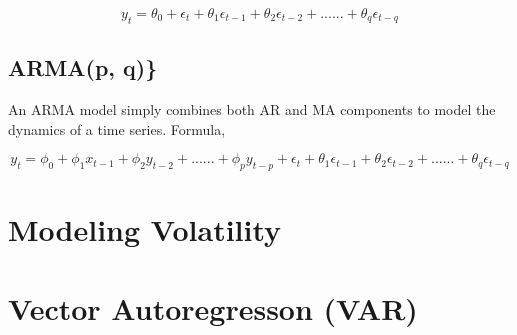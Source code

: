 \documentclass[]{book}
\theoremstyle{definition}
\theoremstyle{definition}
\theoremstyle{definition}
\theoremstyle{remark}
\begin{document}
\begin{equation}
  y_t = \theta_0 + \epsilon_t + \theta_1 \epsilon_{t-1} + \theta_2 \epsilon_{t-2} + ...... + \theta_q \epsilon_{t-q}
    \end{equation}

\section{ARMA(p, q)\}}\label{armap-q}

An ARMA model simply combines both AR and MA components to model the
dynamics of a time series. Formula,

\begin{equation}
   y_t = \phi_0 +\phi_1 x_{t-1} + \phi_2 y_{t-2} + ...... + \phi_p y_{t-p}+\epsilon_t + \theta_1 \epsilon_{t-1} + \theta_2 \epsilon_{t-2} + ...... + \theta_q \epsilon_{t-q}
   \end{equation}

\chapter{Modeling Volatility}\label{modeling-volatility}

\chapter{Vector Autoregresson (VAR)}\label{vector-autoregresson-var}


\end{document}
